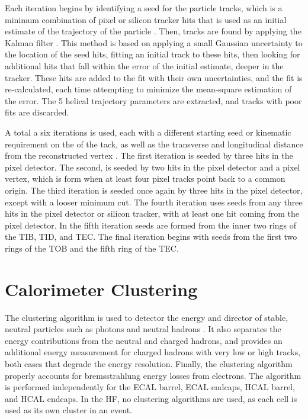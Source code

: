 \par Each iteration begins by identifying a seed for the particle
tracks, which is a minimum combination of pixel or silicon tracker
hits that is used as an initial estimate of the trajectory of the
particle \cite{Chatrchyan:2014fea}.  Then, tracks are found by applying
the Kalman filter \cite{Fruhwirth:1987fm}.  This method is based on
applying a small Gaussian uncertainty to the location of the seed
hits, fitting an initial track to these hits, then looking for
additional hits that fall within the error of the initial estimate,
deeper in the tracker.  These hits are added to the fit with their own
uncertainties, and the fit is re-calculated, each time attempting to
minimize the mean-square estimation of the error.  The 5 helical
trajectory parameters are extracted, and tracks with poor fits are
discarded.    

\par A total a six iterations is used, each with a different starting
seed or kinematic requirement on the \PT of the tack, as well as
the transverse and longitudinal distance from the reconstructed
vertex \cite{Fruhwirth:1987fm}.  The first iteration is seeded by
three hits in the pixel detector.  The second, is seeded by two hits
in the pixel detector and a pixel vertex, which is form when at least
four pixel tracks point back to a common origin.  The third iteration
is seeded once again by three hits in the pixel detector, except with
a looser minimum \PT cut.  The fourth iteration uses seeds from any
three hits in the pixel detector or silicon tracker, with at least one
hit coming from the pixel detector.  In the fifth iteration seeds are
formed from the inner two rings of the TIB, TID, and TEC.  The final
iteration begins with seeds from the first two rings of the TOB and
the fifth ring of the TEC.   


\section{Calorimeter Clustering}
\label{calorimeter_clustering_overview}

\par The clustering algorithm is used to detector the energy and
director of stable, neutral particles such as photons and neutral
hadrons \cite{CMS-PAS-PFT-09-001}.  It also separates the energy
contributions from the neutral and charged hadrons, and provides an
additional energy measurement for charged hadrons with very low or high
\PT tracks, both cases that degrade the energy resolution.  Finally,
the clustering algorithm properly accounts for bremsstrahlung energy
losses from electrons. The algorithm is performed independently for
the ECAL barrel, ECAL endcaps, HCAL barrel, and HCAL endcaps.  In the
HF, no clustering algorithms are used, as each cell is used as its own
cluster in an event.   

